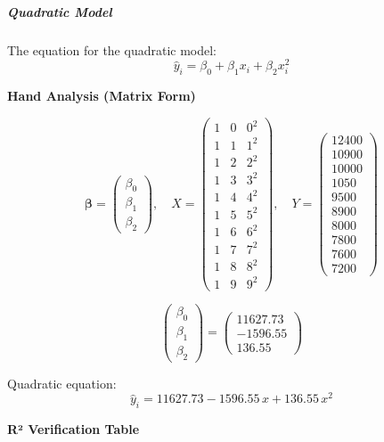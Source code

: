 \documentclass[12pt,a4paper]{article}
\begin{document}
\subparagraph{Quadratic Model}

The equation for the quadratic model:
\begin{equation}
  \hat{y}_i = \beta_0 + \beta_1 x_i + \beta_2 x_i^2
\end{equation}

\textbf{Hand Analysis (Matrix Form)}

\[
\bm{\beta} = \begin{pmatrix}\beta_0\\\beta_1\\\beta_2\end{pmatrix},\quad
X = \begin{pmatrix}1&0&0^2\\1&1&1^2\\1&2&2^2\\1&3&3^2\\1&4&4^2\\1&5&5^2\\1&6&6^2\\1&7&7^2\\1&8&8^2\\1&9&9^2\end{pmatrix},\quad
Y = \begin{pmatrix}12400\\10900\\10000\\1050\\9500\\8900\\8000\\7800\\7600\\7200\end{pmatrix}
\]

\[
\begin{pmatrix}\beta_0\\\beta_1\\\beta_2\end{pmatrix} = \begin{pmatrix}11627.73\\-1596.55\\136.55\end{pmatrix}
\]

Quadratic equation:
\begin{equation}
  \hat{y}_i = 11627.73 - 1596.55\,x + 136.55\,x^2
\end{equation}

\textbf{R² Verification Table}
\end{document}
